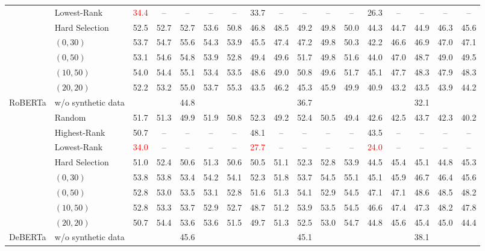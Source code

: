 \begin{table}[t]
\begin{tabular}{llccccccccccccccc}
 & Lowest-Rank & \textcolor{red}{34.4} & -- & -- & -- & -- & 33.7 & -- & -- & -- & -- & 26.3 & -- & -- & -- & -- \\
 & Hard Selection & 52.5 & 52.7 & 52.7 & 53.6 & 50.8 & 46.8 & 48.5 & 49.2 & 49.8 & 50.0 & 44.3 & 44.7 & 44.9 & 46.3 & 45.6 \\
 & $(0, 30)$ & 53.7 & 54.7 & 55.6 & 54.3 & 53.9 & 45.5 & 47.4 & 47.2 & 49.8 & 50.3 & 42.2 & 46.6 & 46.9 & 47.0 & 47.1 \\
 & $(0, 50)$ & 53.1 & 54.6 & 54.8 & 53.9 & 52.8 & 49.4 & 49.6 & 51.7 & 49.8 & 51.6 & 44.0 & 47.0 & 48.7 & 49.0 & 49.5 \\
 & $(10, 50)$ & 54.0 & 54.4 & 55.1 & 53.4 & 53.5 & 48.6 & 49.0 & 50.8 & 49.6 & 51.7 & 45.1 & 47.7 & 48.3 & 47.9 & 48.3 \\
 & $(20, 20)$ & 52.2 & 53.2 & 55.0 & 53.7 & 55.3 & 43.5 & 46.2 & 45.3 & 45.9 & 49.9 & 40.9 & 43.2 & 43.5 & 43.9 & 44.2 \\
\midrule
\multirow{9}{*}{RoBERTa} & w/o synthetic data & \multicolumn{5}{c}{44.8} & \multicolumn{5}{c}{36.7} & \multicolumn{5}{c}{32.1} \\
 & Random & 51.7 & 51.3 & 49.9 & 51.9 & 50.8 & 52.3 & 49.2 & 52.4 & 50.5 & 49.4 & 42.6 & 42.5 & 43.7 & 42.3 & 40.2 \\
 & Highest-Rank & 50.7 & -- & -- & -- & -- & 48.1 & -- & -- & -- & -- & 43.5 & -- & -- & -- & -- \\
 & Lowest-Rank & \textcolor{red}{34.0} & -- & -- & -- & -- & \textcolor{red}{27.7} & -- & -- & -- & -- & \textcolor{red}{24.0} & -- & -- & -- & -- \\
 & Hard Selection & 51.0 & 52.4 & 50.6 & 51.3 & 50.6 & 50.5 & 51.1 & 52.3 & 52.8 & 53.9 & 44.5 & 45.4 & 45.1 & 44.8 & 45.3 \\
 & $(0, 30)$ & 53.8 & 53.8 & 53.4 & 54.2 & 54.1 & 52.3 & 51.8 & 53.7 & 54.5 & 55.1 & 45.1 & 45.9 & 46.7 & 46.4 & 45.6 \\
 & $(0, 50)$ & 52.8 & 53.0 & 53.5 & 53.1 & 52.8 & 51.6 & 51.3 & 54.1 & 52.9 & 54.5 & 47.1 & 47.1 & 48.6 & 48.5 & 48.2 \\
 & $(10, 50)$ & 52.8 & 53.3 & 53.7 & 52.9 & 52.7 & 48.7 & 51.2 & 53.9 & 53.5 & 54.5 & 46.6 & 47.4 & 47.3 & 48.2 & 47.8 \\
 & $(20, 20)$ & 50.7 & 54.4 & 53.6 & 53.6 & 51.5 & 49.7 & 51.3 & 52.5 & 53.0 & 54.7 & 44.8 & 45.6 & 45.4 & 45.0 & 44.4 \\
\midrule
\multirow{9}{*}{DeBERTa} & w/o synthetic data & \multicolumn{5}{c}{45.6} & \multicolumn{5}{c}{45.1} & \multicolumn{5}{c}{38.1} \\

\end{tabular}
\end{table}
